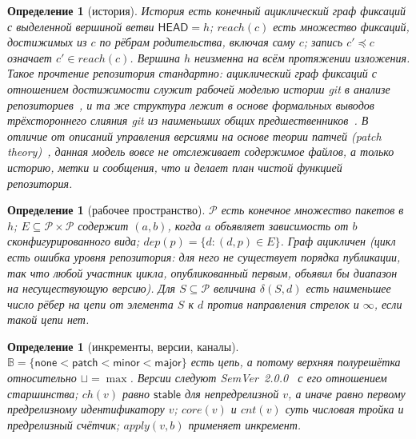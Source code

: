 \documentclass[sigconf,nonacm]{acmart}
\theoremstyle{acmplain}
\theoremstyle{acmdefinition}
\newtheorem{definition}[theorem]{Определение}
\theoremstyle{acmplain}
\begin{document}
\begin{definition}[история]
История есть конечный ациклический граф фиксаций с выделенной вершиной ветви
$\mathsf{HEAD} = h$; $\mathit{reach}(c)$ есть множество фиксаций, достижимых
из $c$ по рёбрам родительства, включая саму $c$; запись $c' \preceq c$ означает
$c' \in \mathit{reach}(c)$. Вершина $h$ неизменна на всём протяжении изложения. Такое
прочтение репозитория стандартно: ациклический граф фиксаций с отношением достижимости служит
рабочей моделью истории git в анализе репозиториев~\cite{birdgit}, и
та же структура лежит в основе формальных выводов трёхстороннего
слияния git из наименьших общих предшественников~\cite{mrdt}. В отличие от
описаний управления версиями на основе теории патчей
(patch theory)~\cite{swierstraloh,hpt,mimram}, данная модель вовсе не отслеживает
содержимое файлов, а только историю, метки и сообщения, что и
делает план чистой функцией репозитория.
\end{definition}

\begin{definition}[рабочее пространство]
$\mathcal{P}$ есть конечное множество пакетов в $h$; $E \subseteq
\mathcal{P} \times \mathcal{P}$ содержит $(a,b)$, когда $a$ объявляет
зависимость от $b$ сконфигурированного вида; $\mathit{dep}(p) = \{d : (d,p)
\in E\}$. Граф ацикличен (цикл есть ошибка уровня репозитория: для него
не существует порядка публикации, так что любой участник цикла, опубликованный первым,
объявил бы диапазон на несуществующую версию). Для $S \subseteq
\mathcal{P}$ величина $\delta(S,d)$ есть наименьшее число рёбер на цепи от
элемента $S$ к $d$ против направления стрелок и $\infty$, если такой цепи нет.
\end{definition}

\begin{definition}[инкременты, версии, каналы]
$\mathbb{B} = \{\mathsf{none} < \mathsf{patch} < \mathsf{minor} <
\mathsf{major}\}$ есть цепь, а потому верхняя полурешётка относительно
$\sqcup = \max$. Версии следуют SemVer~2.0.0~\cite{semver} с его отношением
старшинства; $\mathit{ch}(v)$ равно $\mathsf{stable}$ для непредрелизной
$v$, а иначе равно первому предрелизному идентификатору $v$; $\mathit{core}(v)$
и $\mathit{cnt}(v)$ суть числовая тройка и предрелизный счётчик;
$\mathit{apply}(v,b)$ применяет инкремент.
\end{definition}
\end{document}
